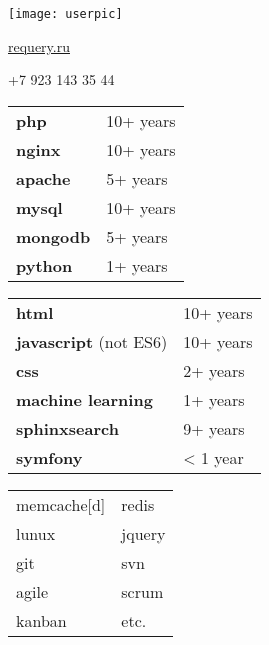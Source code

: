 \documentclass[paper=a4,fontsize=11pt]{eucv}
\begin{document}
\begin{minipage}{.2\linewidth}
   \texttt{[image: userpic]}
\end{minipage}      
\begin{minipage}{0.7\linewidth}
   \sepspace
   \noindent
   
   \hfill {}%
   
   \hfill \href{http://requery.ru}{requery.ru}%
   
   \hfill +7 923 143 35 44%
   
   \hfill {}%
\end{minipage}


\hspace{3mm}
\begin{minipage}[t]{0.33\textwidth} 
	
	\begin{tabular}[t]{ l l }
		\textbf{php} & 10+ years \\
		\textbf{nginx} & 10+ years \\
		\textbf{apache} & 5+ years \\
		\textbf{mysql} & 10+ years \\
		\textbf{mongodb} & 5+ years \\
		\textbf{python} & 1+ years \\
	\end{tabular}
	
	\sepspace
	
\end{minipage}
%
\begin{minipage}[t]{0.33\textwidth} 
	
	\begin{tabular}[t]{ l l }
		\textbf{html} & 10+ years \\
		\textbf{javascript} (not ES6) & 10+ years \\
		\textbf{css} & 2+ years \\
		\textbf{machine learning} & 1+ years \\
		\textbf{sphinxsearch} & 9+ years \\
		\textbf{symfony} & < 1 year
	\end{tabular}
	
	\sepspace
	
\end{minipage}
%
\begin{minipage}[t]{0.33\textwidth} 
	\begin{tabular}[t]{l l}
		memcache[d] & redis \\
		lunux & jquery  \\
		git & svn \\
		agile & scrum  \\
		kanban & etc. \\
	\end{tabular}
\end{minipage}
\end{document}

